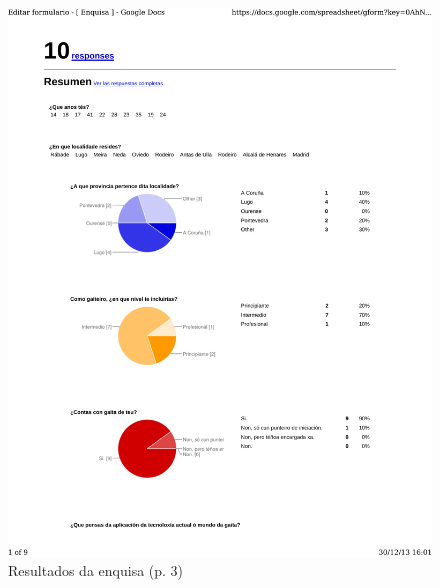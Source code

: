\begin{figure}
 \centering
 \includegraphics[scale=0.7,page=3,keepaspectratio=true]{./imagenes/enquisa.pdf}
 \caption{Resultados da enquisa (p. 3)}
 \label{figura:ResultadosEnquisa3}
\end{figure}

